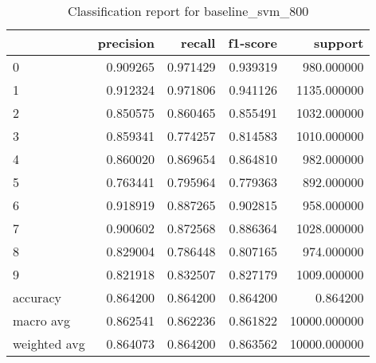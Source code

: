 \begin{table}[htb!]
\centering
\caption{Classification report for baseline_svm_800}
\label{tab:classification-report-baseline_svm_800}
\begin{tabular}{lrrrr}
\toprule
 & precision & recall & f1-score & support \\
\midrule
0 & 0.909265 & 0.971429 & 0.939319 & 980.000000 \\
1 & 0.912324 & 0.971806 & 0.941126 & 1135.000000 \\
2 & 0.850575 & 0.860465 & 0.855491 & 1032.000000 \\
3 & 0.859341 & 0.774257 & 0.814583 & 1010.000000 \\
4 & 0.860020 & 0.869654 & 0.864810 & 982.000000 \\
5 & 0.763441 & 0.795964 & 0.779363 & 892.000000 \\
6 & 0.918919 & 0.887265 & 0.902815 & 958.000000 \\
7 & 0.900602 & 0.872568 & 0.886364 & 1028.000000 \\
8 & 0.829004 & 0.786448 & 0.807165 & 974.000000 \\
9 & 0.821918 & 0.832507 & 0.827179 & 1009.000000 \\
accuracy & 0.864200 & 0.864200 & 0.864200 & 0.864200 \\
macro avg & 0.862541 & 0.862236 & 0.861822 & 10000.000000 \\
weighted avg & 0.864073 & 0.864200 & 0.863562 & 10000.000000 \\
\bottomrule
\end{tabular}
\end{table}
